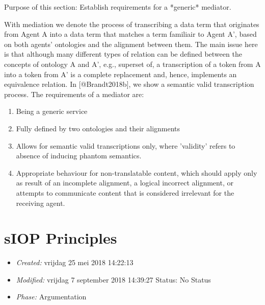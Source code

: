 \documentclass[a4paper,11pt,oneside,oldfontcommands]{memoir}
\theoremstyle{definition}
\theoremstyle{break}		%
\numberwithin{equation}{chapter}
\numberwithin{figure}{chapter}
\begin{document}
\begin{synopsis}
Purpose of this section: Establish requirements for a *generic* mediator.

With mediation we denote the process of transcribing a data term that originates from Agent A into a data term that matches a term familiair to Agent A', based on both agents' ontologies and the alignment between them. The main issue here is that although many different types of relation can be defined between the concepts of ontology A and A', e.g., superset of, a transcription of a token from A into a token from A' is a complete replacement and, hence, implements an equivalence relation. In [@Brandt2018b], we show a semantic valid transcription process. The requirements of a mediator are:

\begin{enumerate}
\item Being a generic service
\item Fully defined by two ontologies and their alignments
\item Allows for semantic valid transcriptions only, where 'validity' refers to absence of inducing phantom semantics.
\item Appropriate behaviour for non-translatable content, which should apply only as result of an incomplete alignment, a logical incorrect alignment, or attempts to communicate content that is considered irrelevant for the receiving agent.
\end{enumerate}
\end{synopsis}

\hypertarget{siop-principles}{%
\chapter{sIOP Principles}\label{siop-principles}}

\begin{itemize}
\tightlist
\item
  \emph{Created:} vrijdag 25 mei 2018 14:22:13
\item
  \emph{Modified:} vrijdag 7 september 2018 14:39:27 Status: No Status
\item
  \emph{Phase:} Argumentation
\end{itemize}
\end{document}
